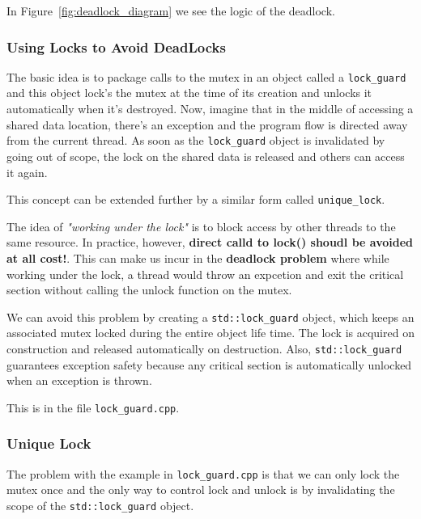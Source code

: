 \documentclass[11pt, a4paper]{article}
\begin{document}
In Figure~\ref{fig:deadlock_diagram} we see the logic of the deadlock.



\subsubsection{Using Locks to Avoid DeadLocks}%
\label{ssub:using_locks_to_avoid_deadlocks}


The basic idea is to package calls to the mutex in an object called a \texttt{lock\_guard} and this object lock's the mutex at the time of its creation and unlocks it automatically when it's destroyed. Now, imagine that in the middle of accessing a shared data location, there's an exception and the program flow is directed away from the current thread. As soon as the \texttt{lock\_guard} object is invalidated by going out of scope, the lock on the shared data is released and others can access it again. 

This concept can be extended further by a similar form called \texttt{unique\_lock}.


The idea of \textit{"working under the lock"} is to block access by other threads to the same resource. In practice, however, \textbf{direct calld to lock() shoudl be avoided at all cost!}. This can make us incur in the \textbf{deadlock problem} where while working under the lock, a thread would throw an expcetion and exit the critical section without calling the unlock function on the mutex. 

We can avoid this problem by creating a \texttt{std::lock\_guard} object, which keeps an associated mutex locked during the entire object life time. The lock is acquired on construction and released automatically on destruction. Also, \texttt{std::lock\_guard} guarantees exception safety because any critical section is automatically unlocked when an exception is thrown. 


This is in the file \texttt{lock\_guard.cpp}. 



\subsubsection{Unique Lock}%
\label{ssub:unique_lock}

The problem with the example in \texttt{lock\_guard.cpp} is that we can only lock the mutex once and the only way to control lock and unlock is by invalidating the scope of the \texttt{std::lock\_guard} object. 
\end{document}
